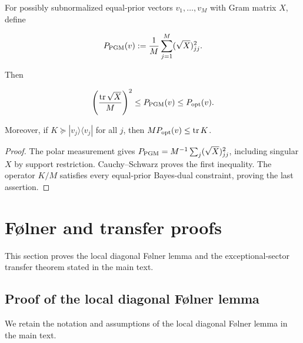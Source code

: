 \begin{lemma}
\label{lem:supp-subnormalized-pgm}
For possibly subnormalized equal-prior vectors \(v_1,\ldots,v_M\) with Gram
matrix \(X\), define

\[
 P_{\rm PGM}(v):=\frac1M\sum_{j=1}^M(\sqrt X)_{jj}^2.
\]

Then

\begin{equation}\label{eq:supp-subnormalized-pgm}
 \left(\frac{\operatorname{tr}\sqrt X}{M}\right)^2
 \le P_{\rm PGM}(v)\le P_{\rm opt}(v).
\end{equation}

Moreover, if \(K\succeq|v_j\rangle\langle v_j|\) for all \(j\), then
\(MP_{\rm opt}(v)\le\operatorname{tr}K\).
\end{lemma}

\begin{proof}
The polar measurement gives
\(P_{\rm PGM}=M^{-1}\sum_j(\sqrt X)_{jj}^2\), including singular \(X\) by
support restriction.  Cauchy--Schwarz proves the first inequality.  The
operator \(K/M\) satisfies every equal-prior Bayes-dual constraint, proving
the last assertion.
\end{proof}

\section{Følner and transfer proofs}
\label{supp:folner-transfer-proofs}

This section proves the local diagonal Følner lemma and the exceptional-sector
transfer theorem stated in the main text.

\subsection{Proof of the local diagonal Følner lemma}

We retain the notation and assumptions of the local diagonal Følner lemma in
the main text.

